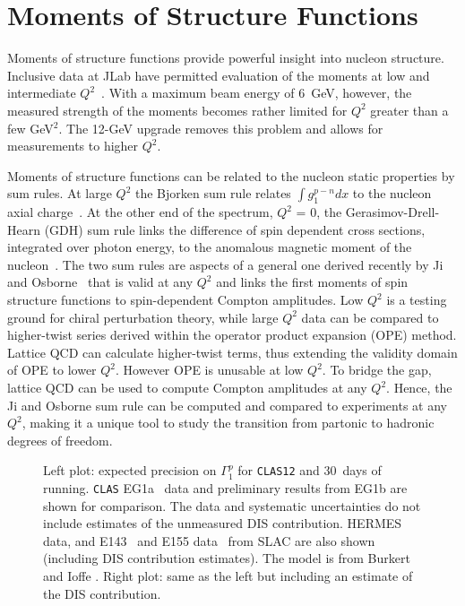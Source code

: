 \section{Moments of Structure Functions}

Moments of structure functions provide powerful insight into nucleon 
structure.  Inclusive data at JLab have permitted evaluation of the moments 
at low and intermediate $Q^2$~\cite{Fatemi:2003yh,Yun:2002td,Chen:2005td}.  
With a maximum beam energy of 6~GeV, however, the measured strength of the 
moments becomes rather limited for $Q^2$ greater than a few GeV$^2$. The 
12-GeV upgrade removes this problem and allows for measurements to higher 
$Q^2$. 

Moments of structure functions can be related to the nucleon static properties 
by sum rules. At large $Q^2$ the Bjorken sum rule relates $\int g_1^{p-n} dx$ 
to the nucleon axial charge~\cite{Bjorken:1966jh}.  At the other end of the 
spectrum, $Q^2$ = 0, the Gerasimov-Drell-Hearn (GDH) sum rule links the 
difference of spin dependent cross sections, integrated over photon energy, 
to the anomalous magnetic moment of the nucleon~\cite{Drell:1966jv,
Gerasimov:1965et}.  The two sum rules are aspects of a general one derived 
recently by Ji and Osborne~\cite{Ji:1999mr} that is valid at any $Q^2$
and links the first moments of spin structure functions to spin-dependent 
Compton amplitudes. Low $Q^2$ is a testing ground for chiral perturbation 
theory, while large $Q^2$ data can be compared to higher-twist series derived 
within the operator product expansion (OPE) method.  Lattice QCD can calculate 
higher-twist terms, thus extending the validity domain of OPE to lower $Q^2$. 
However OPE is unusable at low $Q^2$.  To bridge the gap, lattice QCD can be 
used to compute Compton amplitudes at any $Q^2$.  Hence, the Ji and Osborne 
sum rule can be computed and compared to experiments at any $Q^2$, making it a 
unique tool to study the transition from partonic to hadronic degrees of 
freedom.

\begin{figure}[htb]
\centerline{\epsfxsize=5in}
\caption{\small{Left plot: expected precision on $\Gamma_1^p$ for {\tt CLAS12}
and 30~days of running.  {\tt CLAS} EG1a~\cite{Fatemi:2003yh, Yun:2002td} data 
and preliminary results from EG1b are shown for comparison.  The data and 
systematic uncertainties do not include estimates of the unmeasured DIS 
contribution.  HERMES~\cite{Airapetian:2002wd} data, and E143~\cite{Abe:1998wq} 
and E155 data~\cite{Anthony:2000fn} from SLAC are also shown (including DIS 
contribution estimates).  The model is from Burkert and Ioffe
\cite{Burkert:1992tg,Burkert:1993ya}.  Right plot: same as the left but 
including an estimate of the DIS contribution.}}
\label{expect}
\end{figure}

